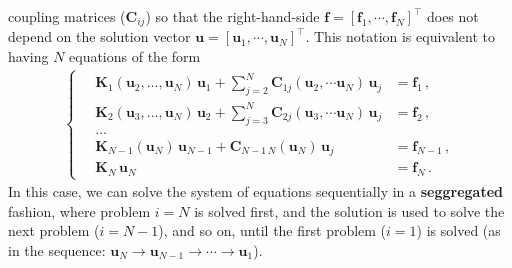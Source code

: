 coupling matrices ($\mathbf{C}_{ij}$) so that the right-hand-side $\mathbf{f}=[\mathbf{f}_1, \cdots, \mathbf{f}_N]^\top$ does not depend
on the solution vector $\mathbf{u}=[\mathbf{u}_1, \cdots, \mathbf{u}_N]^\top$. This notation is equivalent to having $N$ equations of the form
\begin{align}
\left\{
    \begin{aligned}
        \quad \mathbf{K}_1(\mathbf{u}_2, \ldots, \mathbf{u}_N)\, \mathbf{u}_1  + \sum_{j=2}^N \mathbf{C}_{1j} (\mathbf{u}_2, \cdots \mathbf{u}_N)\, \mathbf{u}_j &= \mathbf{f}_1\,, \\
        \quad\mathbf{K}_2(\mathbf{u}_3, \ldots, \mathbf{u}_N)\, \mathbf{u}_2 + \sum_{j=3}^N \mathbf{C}_{2j} (\mathbf{u}_3, \cdots \mathbf{u}_N)\, \mathbf{u}_j &= \mathbf{f}_2\,, \\
        \quad\ldots \\
        \quad\mathbf{K}_{N-1} (\mathbf{u}_N) \, \mathbf{u}_{N-1} + \mathbf{C}_{N-1\, N}(\mathbf{u}_N)\, \mathbf{u}_j &= \mathbf{f}_{N-1} \,, \\
        \quad\mathbf{K}_N \, \mathbf{u}_N &= \mathbf{f}_N\,.
    \end{aligned}
\right.
\end{align}
In this case, we can solve the system of equations sequentially in a \textbf{seggregated} fashion,
 where problem $i=N$ is solved first, and the solution is used to solve the next problem ($i=N-1$), and so on, until the first problem ($i=1$) is solved
 (as in the sequence: $\mathbf{u}_N \to \mathbf{u}_{N-1} \to \cdots \to \mathbf{u}_1$).\\

